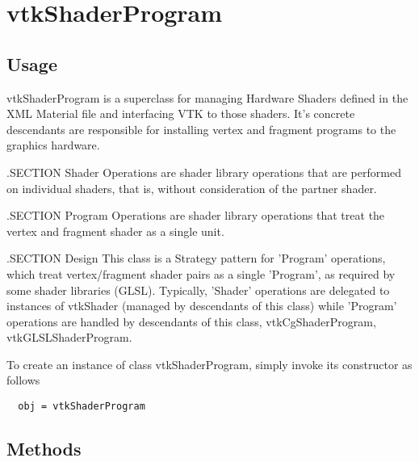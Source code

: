 \section{vtkShaderProgram}

\subsection{Usage}

 vtkShaderProgram is a superclass for managing Hardware Shaders
 defined in the XML Material file and interfacing VTK to those shaders.
 It's concrete descendants are responsible for installing vertex and
 fragment programs to the graphics hardware.

 .SECTION Shader Operations are shader library operations that are performed
 on individual shaders, that is, without consideration of the partner shader.

 .SECTION Program Operations are shader library operations that treat the 
 vertex and fragment shader as a single unit.

 .SECTION Design
 This class is a Strategy pattern for 'Program' operations, which treat
 vertex/fragment shader pairs as a single 'Program', as required by some
 shader libraries (GLSL). Typically, 'Shader' operations are delegated
 to instances of vtkShader (managed by descendants of this class)
 while 'Program' operations are handled by descendants of this class,
 vtkCgShaderProgram, vtkGLSLShaderProgram.


To create an instance of class vtkShaderProgram, simply
invoke its constructor as follows
\begin{verbatim}
  obj = vtkShaderProgram
\end{verbatim}
\subsection{Methods}

